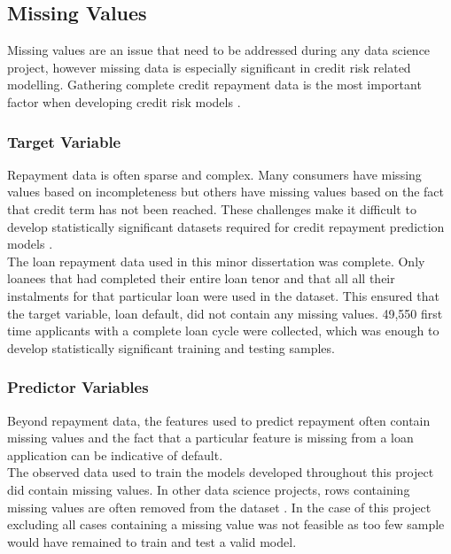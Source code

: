 \subsection{Missing Values}

Missing values are an issue that need to be addressed during any data science project, however missing data is especially significant in credit risk related modelling. Gathering complete credit repayment data is the most important factor when developing credit risk models \parencite{MissingValuesBos}.

\subsubsection{Target Variable}

Repayment data is often sparse and complex. Many consumers have missing values based on incompleteness but others have missing values based on the fact that credit term has not been reached. These challenges make it difficult to develop statistically significant datasets required for credit repayment prediction models \parencite{MissingValuesCR}. \\ 

The loan repayment data used in this minor dissertation was complete. Only loanees that had completed their entire loan tenor and that all all their instalments for that particular loan were used in the dataset. This ensured that the target variable, loan default, did not contain any missing values. 49,550 first time applicants with a complete loan cycle were collected, which was enough to develop statistically significant training and testing samples. 

\subsubsection{Predictor Variables}

Beyond repayment data, the features used to predict repayment often contain missing values and the fact that a particular feature is missing from a loan application can be indicative of default. \\

The observed data used to train the models developed throughout this project did contain missing values. In other data science projects, rows containing missing values are often removed from the dataset \parencite{MissingValues}.  In the case of this project excluding all cases containing a missing value was not feasible as too few sample would have remained to train and test a valid model. \\

